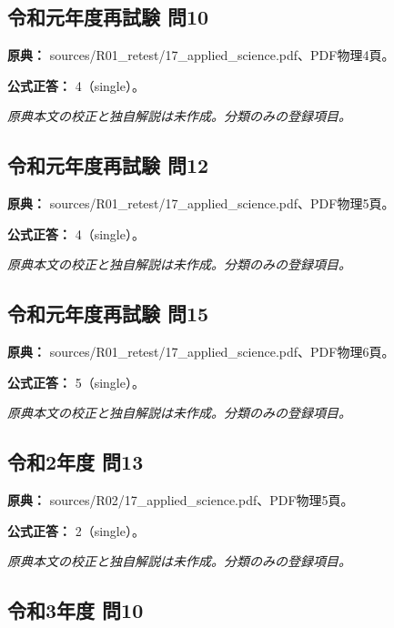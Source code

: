 \subsection{令和元年度再試験 問10}
\label{q:r01-ret-applied-10}

\noindent\textbf{原典：} sources/R01\_retest/17\_applied\_science.pdf、PDF物理4頁。

\textbf{公式正答：} 4（single）。

\par\textit{原典本文の校正と独自解説は未作成。分類のみの登録項目。}

\subsection{令和元年度再試験 問12}
\label{q:r01-ret-applied-12}

\noindent\textbf{原典：} sources/R01\_retest/17\_applied\_science.pdf、PDF物理5頁。

\textbf{公式正答：} 4（single）。

\par\textit{原典本文の校正と独自解説は未作成。分類のみの登録項目。}

\subsection{令和元年度再試験 問15}
\label{q:r01-ret-applied-15}

\noindent\textbf{原典：} sources/R01\_retest/17\_applied\_science.pdf、PDF物理6頁。

\textbf{公式正答：} 5（single）。

\par\textit{原典本文の校正と独自解説は未作成。分類のみの登録項目。}

\subsection{令和2年度 問13}
\label{q:r02-reg-applied-13}

\noindent\textbf{原典：} sources/R02/17\_applied\_science.pdf、PDF物理5頁。

\textbf{公式正答：} 2（single）。

\par\textit{原典本文の校正と独自解説は未作成。分類のみの登録項目。}

\subsection{令和3年度 問10}
\label{q:r03-reg-applied-10}

